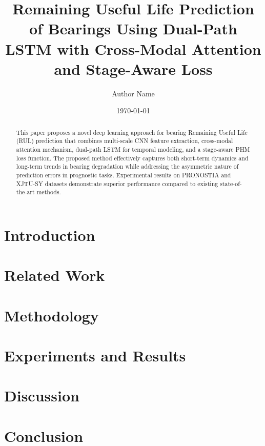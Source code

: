 \documentclass{article}
\title{Remaining Useful Life Prediction of Bearings Using Dual-Path LSTM with Cross-Modal Attention and Stage-Aware Loss}
\author{Author Name}
\date{\today}
\begin{document}
\maketitle

\begin{abstract}
This paper proposes a novel deep learning approach for bearing Remaining Useful Life (RUL) prediction that combines multi-scale CNN feature extraction, cross-modal attention mechanism, dual-path LSTM for temporal modeling, and a stage-aware PHM loss function. The proposed method effectively captures both short-term dynamics and long-term trends in bearing degradation while addressing the asymmetric nature of prediction errors in prognostic tasks. Experimental results on PRONOSTIA and XJTU-SY datasets demonstrate superior performance compared to existing state-of-the-art methods.
\end{abstract}

\section{Introduction}

\section{Related Work}

\section{Methodology}

\section{Experiments and Results}

\section{Discussion}

\section{Conclusion}



\end{document}
